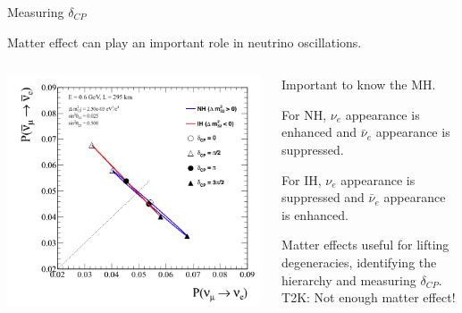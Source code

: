 %
%
\begin{frame}{Measuring $\delta_{CP}$}

{\small
 Matter effect can play an important role in neutrino oscillations.
}

\begin{columns}
  \begin{column}{0.60\textwidth}
    \begin{center}
       \includegraphics[width=0.99\textwidth]{./images/biprob/biprob_t2k_matter_maximal}
    \end{center}
  \end{column}
  \begin{column}{0.40\textwidth}
  {\small
      Important to know the MH.
      \begin{itemize}
      {\small
         \item For NH, $\nu_e$ appearance is enhanced and
           $\bar{\nu}_e$ appearance is suppressed.
         \item For IH, $\nu_e$ appearance is suppressed and
           $\bar{\nu}_e$ appearance is enhanced.
      }
      \end{itemize}
      \vspace{0.1cm}
      Matter effects useful for lifting degeneracies,
      identifying the hierarchy and measuring $\delta_{CP}$.\\
      \vspace{0.1cm}
      T2K: Not enough matter effect!
  }
  \end{column}
\end{columns}

\end{frame}

